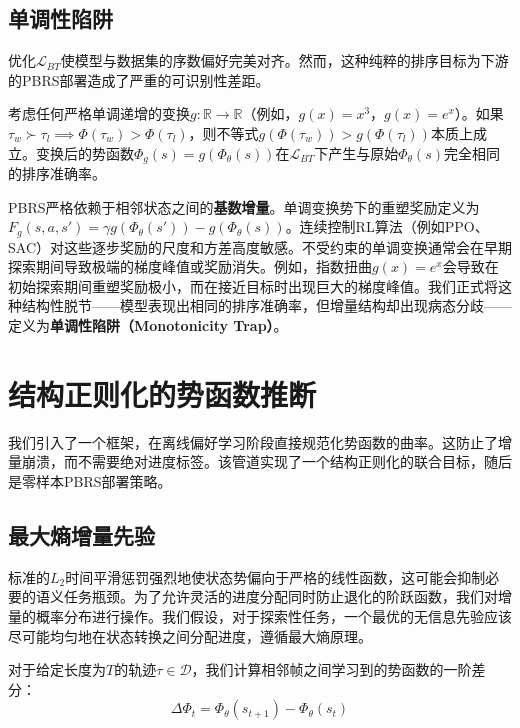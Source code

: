 \subsection{单调性陷阱}

优化$\mathcal{L}_{BT}$使模型与数据集的序数偏好完美对齐。然而，这种纯粹的排序目标为下游的PBRS部署造成了严重的可识别性差距。

考虑任何严格单调递增的变换$g: \mathbb{R} \to \mathbb{R}$（例如，$g(x) = x^3$，$g(x) = e^x$）。如果$\tau_w \succ \tau_l \implies \Phi(\tau_w) > \Phi(\tau_l)$，则不等式$g(\Phi(\tau_w)) > g(\Phi(\tau_l))$本质上成立。变换后的势函数$\Phi_g(s) = g(\Phi_\theta(s))$在$\mathcal{L}_{BT}$下产生与原始$\Phi_\theta(s)$完全相同的排序准确率。

PBRS严格依赖于相邻状态之间的\textbf{基数增量}。单调变换势下的重塑奖励定义为$F_g(s, a, s') = \gamma g(\Phi_\theta(s')) - g(\Phi_\theta(s))$。连续控制RL算法（例如PPO\cite{schulman2017}、SAC\cite{haarnoja2018}）对这些逐步奖励的尺度和方差高度敏感。不受约束的单调变换通常会在早期探索期间导致极端的梯度峰值或奖励消失。例如，指数扭曲$g(x) = e^x$会导致在初始探索期间重塑奖励极小，而在接近目标时出现巨大的梯度峰值。我们正式将这种结构性脱节——模型表现出相同的排序准确率，但增量结构却出现病态分歧——定义为\textbf{单调性陷阱（Monotonicity Trap）}。



\clearpage
\section{结构正则化的势函数推断}

我们引入了一个框架，在离线偏好学习阶段直接规范化势函数的曲率。这防止了增量崩溃，而不需要绝对进度标签。该管道实现了一个结构正则化的联合目标，随后是零样本PBRS部署策略。

\subsection{最大熵增量先验}

标准的$L_2$时间平滑惩罚强烈地使状态势偏向于严格的线性函数，这可能会抑制必要的语义任务瓶颈。为了允许灵活的进度分配同时防止退化的阶跃函数，我们对增量的概率分布进行操作。我们假设，对于探索性任务，一个最优的无信息先验应该尽可能均匀地在状态转换之间分配进度，遵循最大熵原理\cite{shannon1948,jaynes1957}。

对于给定长度为$T$的轨迹$\tau \in \mathcal{D}$，我们计算相邻帧之间学习到的势函数的一阶差分：
\begin{equation}
\label{eq:delta_phi}
    \Delta\Phi_t = \Phi_\theta(s_{t+1}) - \Phi_\theta(s_t)
\end{equation}

